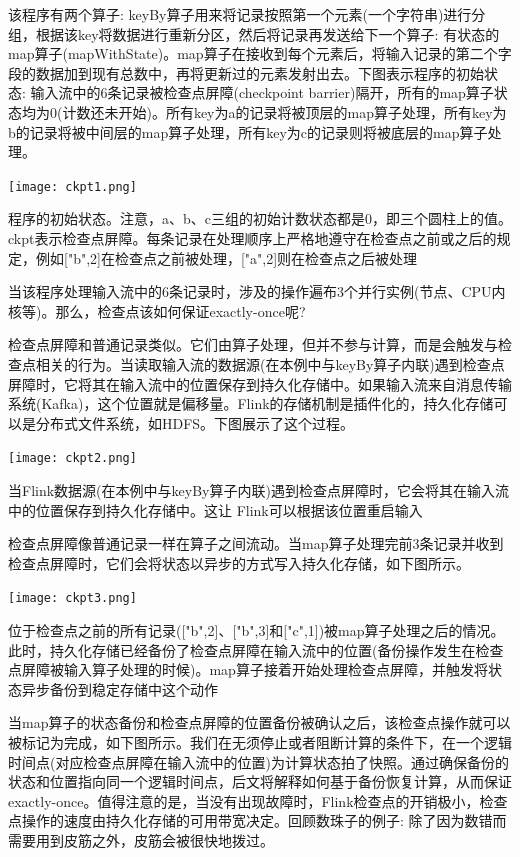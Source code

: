 \documentclass[oneside]{ctexbook}
\begin{document}
该程序有两个算子: keyBy算子用来将记录按照第一个元素(一个字符串)进行分组，根据该key将数据进行重新分区，然后将记录再发送给下一个算子: 有状态的map算子(mapWithState)。map算子在接收到每个元素后，将输入记录的第二个字段的数据加到现有总数中，再将更新过的元素发射出去。下图表示程序的初始状态: 输入流中的6条记录被检查点屏障(checkpoint barrier)隔开，所有的map算子状态均为0(计数还未开始)。所有key为a的记录将被顶层的map算子处理，所有key为b的记录将被中间层的map算子处理，所有key为c的记录则将被底层的map算子处理。

\noindent \texttt{[image: ckpt1.png]}

程序的初始状态。注意，a、b、c三组的初始计数状态都是0，即三个圆柱上的值。ckpt表示检查点屏障。每条记录在处理顺序上严格地遵守在检查点之前或之后的规定，例如["b",2]在检查点之前被处理，["a",2]则在检查点之后被处理

当该程序处理输入流中的6条记录时，涉及的操作遍布3个并行实例(节点、CPU内核等)。那么，检查点该如何保证exactly-once呢?

检查点屏障和普通记录类似。它们由算子处理，但并不参与计算，而是会触发与检查点相关的行为。当读取输入流的数据源(在本例中与keyBy算子内联)遇到检查点屏障时，它将其在输入流中的位置保存到持久化存储中。如果输入流来自消息传输系统(Kafka)，这个位置就是偏移量。Flink的存储机制是插件化的，持久化存储可以是分布式文件系统，如HDFS。下图展示了这个过程。

\noindent \texttt{[image: ckpt2.png]}

当Flink数据源(在本例中与keyBy算子内联)遇到检查点屏障时，它会将其在输入流中的位置保存到持久化存储中。这让 Flink可以根据该位置重启输入

检查点屏障像普通记录一样在算子之间流动。当map算子处理完前3条记录并收到检查点屏障时，它们会将状态以异步的方式写入持久化存储，如下图所示。

\noindent \texttt{[image: ckpt3.png]}

位于检查点之前的所有记录(["b",2]、["b",3]和["c",1])被map算子处理之后的情况。此时，持久化存储已经备份了检查点屏障在输入流中的位置(备份操作发生在检查点屏障被输入算子处理的时候)。map算子接着开始处理检查点屏障，并触发将状态异步备份到稳定存储中这个动作

当map算子的状态备份和检查点屏障的位置备份被确认之后，该检查点操作就可以被标记为完成，如下图所示。我们在无须停止或者阻断计算的条件下，在一个逻辑时间点(对应检查点屏障在输入流中的位置)为计算状态拍了快照。通过确保备份的状态和位置指向同一个逻辑时间点，后文将解释如何基于备份恢复计算，从而保证exactly-once。值得注意的是，当没有出现故障时，Flink检查点的开销极小，检查点操作的速度由持久化存储的可用带宽决定。回顾数珠子的例子: 除了因为数错而需要用到皮筋之外，皮筋会被很快地拨过。
\end{document}

